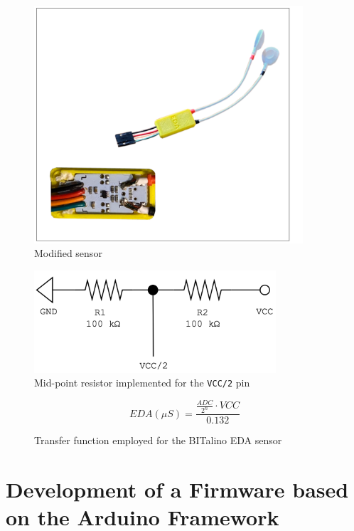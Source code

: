 \begin{figure}
    \centering
    \includegraphics[width=10cm]{./images/full-sensor-view.drawio.png}
    \caption{Modified sensor}
    \label{fig:full-sensor-configuration}
\end{figure}

\begin{figure}
    \centering
    \includegraphics[width=9cm]{./images/midpoint-resistor.drawio.png}
    \caption{Mid-point resistor implemented for the \texttt{VCC/2} pin}
    \label{fig:voltage-divider-schema}
\end{figure}

\begin{figure}
    \begingroup
    \Large
    \begin{equation}
    EDA(\mu S) = \frac{\frac{ADC}{2^n} \cdot VCC}{0.132}
    \end{equation}
    \caption{Transfer function employed for the BITalino EDA sensor}
    \label{fig:bitalino-transfer-function}
    \endgroup
\end{figure}

\pagebreak

\section{Development of a Firmware based on the Arduino Framework}\label{sec:firmware}

